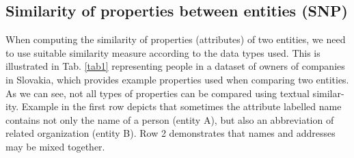 \documentclass{llncs}
\begin{document}
\subsection{Similarity of properties between entities (SNP)}
When computing the similarity of properties (attributes) of two entities, we need
to use suitable similarity measure according to the data types used. This is illustrated in Tab.
\ref{tab1} representing people in a dataset of owners of companies in
Slovakia, which provides example properties used when comparing two entities.
As we can see, not all types of properties can be compared using textual similar-
ity. Example in the first row depicts that sometimes the attribute labelled name
contains not only the name of a person (entity A), but also an abbreviation of
related organization (entity B). Row 2 demonstrates that names and addresses
may be mixed together.
\end{document}

